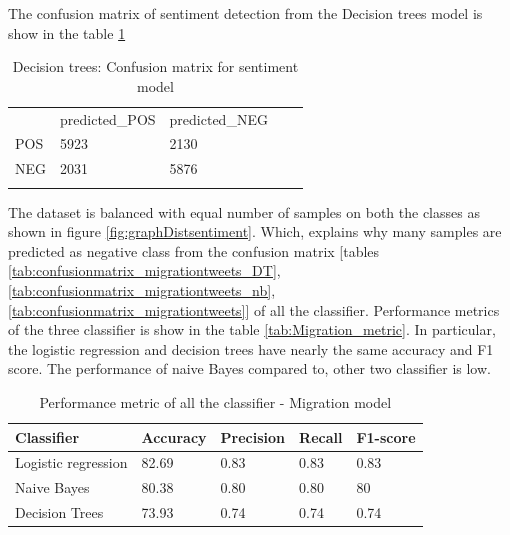 \begin{itemize}
    The confusion matrix of sentiment detection from the Decision trees model is show in the table \ref{tab:confusionmatrix_sentimenttweets_DT}
    
    \begin{table}[]
\centering
\begin{tabular}{lllll}
\cline{1-3}
\multicolumn{1}{|l|}{}   & \multicolumn{1}{l|}{predicted\_POS} & \multicolumn{1}{l|}{predicted\_NEG}  &  &  \\ \cline{1-3}
\multicolumn{1}{|l|}{POS} & \multicolumn{1}{l|}{5923}  & \multicolumn{1}{l|}{2130} &  &  \\ \cline{1-3}
\multicolumn{1}{|l|}{NEG}   & \multicolumn{1}{l|}{2031}  & \multicolumn{1}{l|}{5876}  &  &  \\ \cline{1-3}
                            &                           &                           &  & 
\end{tabular}
\caption{Decision trees: Confusion matrix for sentiment model}
\label{tab:confusionmatrix_sentimenttweets_DT}
\end{table}
     
\end{itemize}


 The dataset is balanced with equal number of samples on both the classes as shown in figure \ref{fig:graphDistsentiment}. Which, explains why many samples are predicted as negative class from the confusion matrix [tables \ref{tab:confusionmatrix_migrationtweets_DT}, \ref{tab:confusionmatrix_migrationtweets_nb}, \ref{tab:confusionmatrix_migrationtweets}]  of all the classifier. Performance metrics of the three classifier is show in the table \ref{tab:Migration_metric}. In particular, the logistic regression and decision trees have nearly the same accuracy and F1 score. The performance of naive Bayes compared to, other two classifier is low.

\begin{table}[]
\centering
\begin{tabular}{lllll}
\hline
\textbf{Classifier} & \textbf{Accuracy} & \textbf{Precision} & \textbf{Recall} & \textbf{F1-score} \\ \hline
Logistic regression & 82.69             & 0.83              & 0.83           & 0.83             \\ \hline
Naive Bayes         & 80.38             & 0.80              & 0.80           & 80             \\ \hline
Decision Trees     & 73.93             &  0.74              &  0.74           &  0.74             \\ \hline
\end{tabular}
\caption{Performance metric of all the classifier - Migration model}
\label{tab:sentiment_metric}
\end{table}




